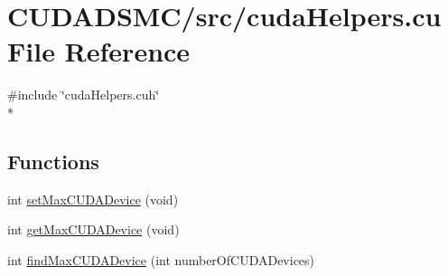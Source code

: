 \hypertarget{cuda_helpers_8cu}{\section{C\+U\+D\+A\+D\+S\+M\+C/src/cuda\+Helpers.cu File Reference}
\label{cuda_helpers_8cu}
}
{\ttfamily \#include \char`\"{}cuda\+Helpers.\+cuh\char`\"{}}\\*
\subsection*{Functions}
\begin{DoxyCompactItemize}
\item 
int \hyperlink{cuda_helpers_8cu_a3932624435386d42fbbae3baa5427ea7}{set\+Max\+C\+U\+D\+A\+Device} (void)
\item 
int \hyperlink{cuda_helpers_8cu_aa9d1113c5dfae69bf665cde1540b10b0}{get\+Max\+C\+U\+D\+A\+Device} (void)
\item 
int \hyperlink{cuda_helpers_8cu_a5a240b2ccb6a4fdb776a9bf0a338a6ea}{find\+Max\+C\+U\+D\+A\+Device} (int number\+Of\+C\+U\+D\+A\+Devices)
\end{DoxyCompactItemize}


